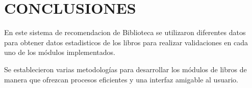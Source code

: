 \section{CONCLUSIONES} 

En este sistema de recomendacion de Biblioteca se utilizaron diferentes datos para obtener datos estadisticos de los libros para realizar validaciones en cada uno de los módulos implementados. 

Se establecieron varias metodologías para desarrollar los módulos de libros de manera que ofrezcan procesos eficientes y una interfaz amigable al usuario.
